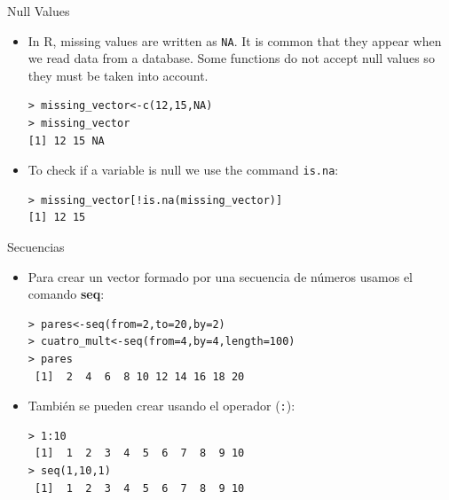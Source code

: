 \documentclass[handout]{beamer}
\begin{document}
\begin{frame}[fragile]{Null Values}
\scriptsize{
\begin{itemize}
\item In R, missing values are written as \verb+NA+. It is common that they appear when we read data from a database. Some functions do not accept null values so they must be taken into account.
\begin{verbatim}
> missing_vector<-c(12,15,NA)
> missing_vector
[1] 12 15 NA
\end{verbatim}

\item To check if a variable is null we use the command \verb+is.na+:
\begin{verbatim}
> missing_vector[!is.na(missing_vector)]
[1] 12 15 
\end{verbatim}



\end{itemize}

 }
 
 
\end{frame}




\begin{frame}[fragile]{Secuencias}
 \scriptsize{
 
 \begin{itemize}
  \item Para crear un vector formado por una secuencia de números usamos el comando \textbf{seq}:
 
 \begin{verbatim}
> pares<-seq(from=2,to=20,by=2)
> cuatro_mult<-seq(from=4,by=4,length=100)
> pares
 [1]  2  4  6  8 10 12 14 16 18 20
 \end{verbatim} 
 \item También se pueden crear usando el operador (\verb+:+):
 \begin{verbatim}
> 1:10
 [1]  1  2  3  4  5  6  7  8  9 10 
> seq(1,10,1)
 [1]  1  2  3  4  5  6  7  8  9 10
 \end{verbatim} 
 \end{itemize}
 
 }
\end{frame}
\end{document}
